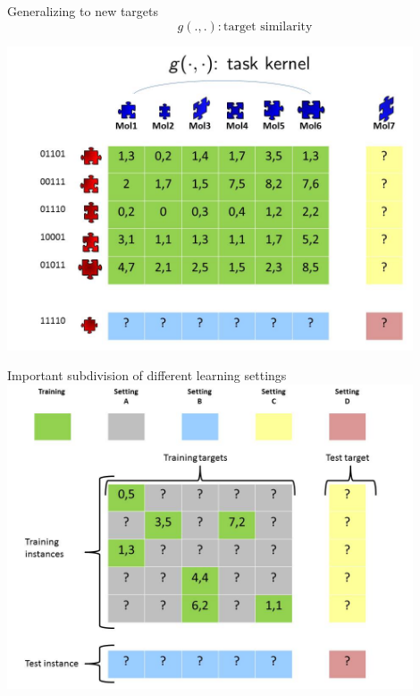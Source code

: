 \documentclass[]{beamer}
\begin{document}
\begin{frame}{Generalizing to new targets}
$$\qquad g(.,.): \mbox{target similarity}$$

\includegraphics[width=0.9\textwidth,trim = 0 0 0 60,clip]{Figures/pictures/Slide7}
\end{frame}

\begin{frame}{Important subdivision of different learning settings}
   \center
	\vspace{0.4cm}
   \includegraphics[width=0.9\textwidth]{Figures/pictures/Slide16} %
\end{frame}
\end{document}
